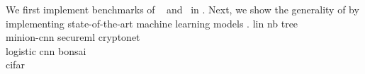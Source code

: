 We first implement benchmarks of ~\cite{shafindss} and~\cite{minionn} in \tool.
Next, we show the generality of \tool by implementing state-of-the-art machine learning models
. 
lin
nb
tree\\
minion-cnn
secureml
cryptonet\\
logistic
cnn
bonsai\\
cifar